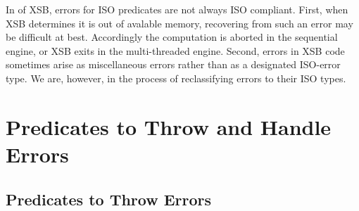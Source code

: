 In \version{} of XSB, errors for ISO predicates are not always ISO
compliant.  First, when XSB determines it is out of avalable memory,
recovering from such an error may be difficult at best.  Accordingly
the computation is aborted in the sequential engine, or XSB exits in
the multi-threaded engine.  Second, errors in XSB code sometimes arise
as miscellaneous errors rather than as a designated ISO-error type.
We are, however, in the process of reclassifying errors to their ISO
types.

\section{Predicates to Throw and Handle Errors}
\label{sec:errorpredicates}

\subsection{Predicates to Throw Errors}


